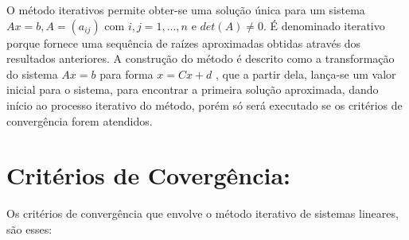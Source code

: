 \documentclass[
12pt,				%
openright,			%
twoside,			%
a4paper,			%
english,			%
french,				%
spanish,			%
brazil				%
]{abntex2_new}
\begin{document}
		O método iterativos permite obter-se uma solução única para um sistema
		$Ax=b, A = (a_{ij} ) $ com 
		$i,j=1,...,n$ e $det(A) \neq 0$. É denominado iterativo porque fornece uma
		sequência de raízes aproximadas
		obtidas através dos resultados anteriores. A construção do método é descrito
		como a transformação do 
		sistema $Ax = b$ para forma $x = Cx + d$ , que a partir dela, lança-se um valor
		inicial para o sistema, 
		para encontrar a primeira solução aproximada, dando início ao processo iterativo
		do método, porém 
		só será executado se os critérios de convergência forem atendidos.
		
		\section{Critérios de Covergência:}	
		
		Os critérios de convergência que envolve o método iterativo de sistemas lineares, são
		esses:
		
\end{document}

